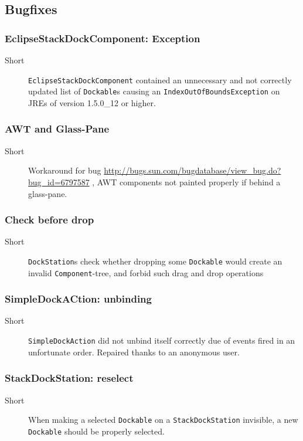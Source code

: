 \documentclass[a4paper,10pt]{article}
\newcommand{\src}[1]{\lstinline[basicstyle=\normalsize\ttfamily,keywordstyle=\normalsize\ttfamily,identifierstyle=\normalsize\ttfamily]|#1|}
\newcommand{\short}{\item[Short]}
\begin{document}
\subsection{Bugfixes}
\subsubsection{EclipseStackDockComponent: Exception}
\begin{description}
 \short \src{EclipseStackDockComponent} contained an unnecessary and not correctly updated list of \src{Dockable}s causing an \src{IndexOutOfBoundsException} on JREs of version 1.5.0\_12 or higher.
\end{description}

\subsubsection{AWT and Glass-Pane}
\begin{description}
 \short Workaround for bug \url{http://bugs.sun.com/bugdatabase/view_bug.do?bug_id=6797587} , AWT components not painted properly if behind a glass-pane.
\end{description}

\subsubsection{Check before drop}
\begin{description}
 \short \src{DockStation}s check whether dropping some \src{Dockable} would create an invalid \src{Component}-tree, and forbid such drag and drop operations
 \end{description}

\subsubsection{SimpleDockACtion: unbinding}
\begin{description}
 \short \src{SimpleDockAction} did not unbind itself correctly due of events fired in an unfortunate order. Repaired thanks to an anonymous user.
\end{description}

\subsubsection{StackDockStation: reselect}
\begin{description}
 \short When making a selected \src{Dockable} on a \src{StackDockStation} invisible, a new \src{Dockable} should be properly selected.
\end{description}
\end{document}
